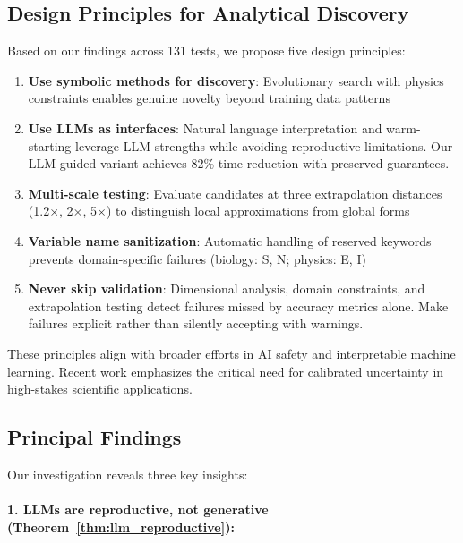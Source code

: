 \documentclass[twoside,11pt]{article}
\begin{document}
\subsection{Design Principles for Analytical Discovery}

Based on our findings across 131 tests, we propose five design principles:

\begin{enumerate}
\item \textbf{Use symbolic methods for discovery}: Evolutionary search with physics constraints enables genuine novelty beyond training data patterns

\item \textbf{Use LLMs as interfaces}: Natural language interpretation and warm-starting leverage LLM strengths while avoiding reproductive limitations. Our LLM-guided variant achieves 82\% time reduction with preserved guarantees.

\item \textbf{Multi-scale testing}: Evaluate candidates at three extrapolation distances (1.2$\times$, 2$\times$, 5$\times$) to distinguish local approximations from global forms

\item \textbf{Variable name sanitization}: Automatic handling of reserved keywords prevents domain-specific failures (biology: S, N; physics: E, I)

\item \textbf{Never skip validation}: Dimensional analysis, domain constraints, and extrapolation testing detect failures missed by accuracy metrics alone. Make failures explicit rather than silently accepting with warnings.
\end{enumerate}

These principles align with broader efforts in AI safety and interpretable machine learning. Recent work emphasizes the critical need for calibrated uncertainty in high-stakes scientific applications.

\subsection{Principal Findings}

Our investigation reveals three key insights:

\paragraph{1. LLMs are reproductive, not generative (Theorem~\ref{thm:llm_reproductive}):}
\end{document}
